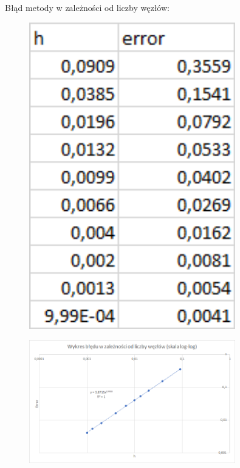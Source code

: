 \begin{samepage}
	Błąd metody w zależności od liczby węzłów:
	\begin{figure}[!ht]
		\begin{center}
			\includegraphics[width=0.8\textwidth]{Lab4/charts/zad4/1/error_dane.png}
		\end{center}
	\end{figure}
	\FloatBarrier
\end{samepage} 

\begin{samepage}
	
	\begin{figure}[!ht]
		\begin{center}
			\includegraphics[width=0.8\textwidth]{Lab4/charts/zad4/1/error.png}
		\end{center}
	\end{figure}
	\FloatBarrier
\end{samepage} 


